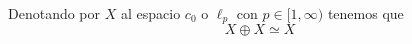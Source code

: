 					
			
			
			
			\begin{lemma}\label{lm:X-XX}
				Denotando por $X$ al espacio $c_0$ o $\ell_p$ con $p\in [1,\infty)$ tenemos que 
				\[X\oplus X \simeq X\]
			\end{lemma}
			
